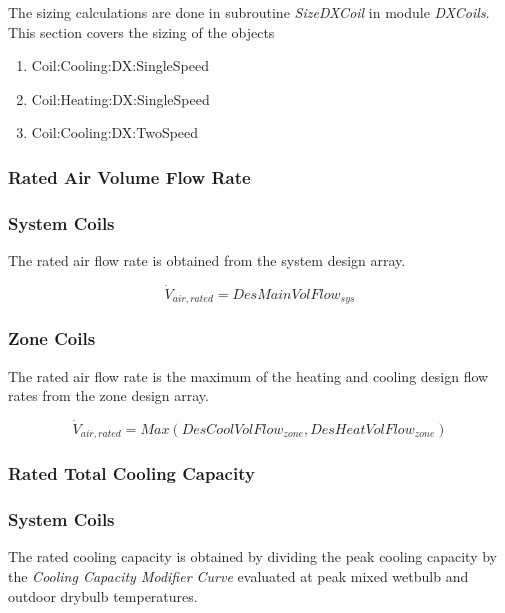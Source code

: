 The sizing calculations are done in subroutine \emph{SizeDXCoil} in module \emph{DXCoils}. This section covers the sizing of the objects

\begin{enumerate}
\def\labelenumi{\arabic{enumi}.}
\item
  Coil:Cooling:DX:SingleSpeed
\item
  Coil:Heating:DX:SingleSpeed
\item
  Coil:Cooling:DX:TwoSpeed
\end{enumerate}

\subsubsection{Rated Air Volume Flow Rate}\label{rated-air-volume-flow-rate}

\subsubsection{System Coils}\label{system-coils-4}

The rated air flow rate is obtained from the system design array.

\begin{equation}
\dot V_{air,rated} = DesMainVolFlow_{sys}
\end{equation}

\subsubsection{Zone Coils}\label{zone-coils-4}

The rated air flow rate is the maximum of the heating and cooling design flow rates from the zone design array.

\begin{equation}
\dot V_{air,rated} = Max(DesCoolVolFlow_{zone},DesHeatVolFlow_{zone})
\end{equation}

\subsubsection{Rated Total Cooling Capacity}\label{rated-total-cooling-capacity-2}

\subsubsection{System Coils}\label{system-coils-5}

The rated cooling capacity is obtained by dividing the peak cooling capacity by the \emph{Cooling Capacity Modifier Curve} evaluated at peak mixed wetbulb and outdoor drybulb temperatures.

